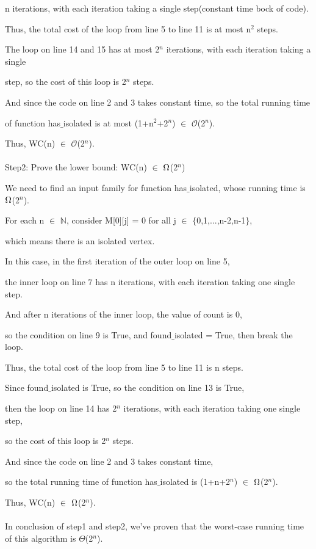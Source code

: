 \documentclass[12pt]{article}
\begin{document}
n iterations, with each iteration taking a single step(constant time bock of code). 

Thus, the total cost of the loop from line 5 to line 11 is at most n$^{2}$ steps.

The loop on line 14 and 15 has at most 2$^{n}$ iterations, with each iteration taking a single 

step, so the cost of this loop is 2$^{n}$ steps.

And since the code on line 2 and 3 takes constant time, so the total running time 

of function has$\_$isolated is at most (1+n$^{2}$+2$^{n}$) $\in$  $\mathcal{O}$(2$^{n}$).

Thus, WC(n) $\in$ $\mathcal{O}$(2$^{n}$).\\
\\
Step2: Prove the lower bound:  WC(n) $\in$ $\ohm$(2$^{n}$)

We need to find an input family for function has$\_$isolated, whose running time is $\ohm$(2$^{n}$).

For each n $\in$ $\mathbb{N}$, consider M[0][j] = 0 for all j $\in$ $\{$0,1,...,n-2,n-1$\}$, 

which means there is an isolated vertex.

In this case, in the first iteration of the outer loop on line 5, 

the inner loop on line 7 has n iterations, with each iteration taking one single step. 

And after n iterations of the inner loop, the value of count is 0, 

so the  condition on line 9 is True, and found$\_$isolated = True, then break the loop.

Thus, the total cost of the loop from line 5 to line 11 is n steps.

Since found$\_$isolated is True, so the condition on line 13 is True, 

then the loop on line 14 has 2$^{n}$ iterations, with each iteration taking one single step, 

so the cost of this loop is 2$^{n}$ steps.

And since the code on line 2 and 3 takes constant time, 

so the total running time of function has$\_$isolated is (1+n+2$^{n}$) $\in$ $\ohm$(2$^{n}$).

Thus, WC(n) $\in$ $\ohm$(2$^{n}$).\\
\\
In conclusion of step1 and step2, we've proven that the worst-case running time of this algorithm is $\Theta$(2$^{n}$). \\
\end{document}
